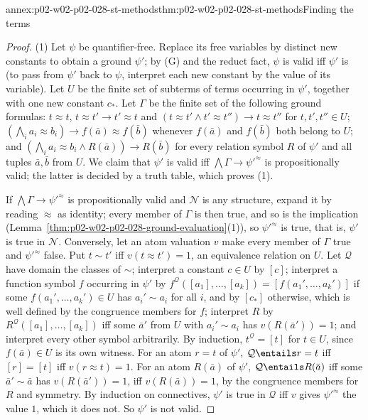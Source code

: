 \begin{annexitem}{annex:p02-w02-p02-028-st-methods}{thm:p02-w02-p02-028-st-methods}{Finding the terms}
\begin{proof}
(1)  Let \(\psi\) be quantifier-free.  Replace its free variables by distinct
new constants to obtain a ground \(\psi'\); by (G) and the reduct fact,
\(\psi\) is valid iff \(\psi'\) is (to pass from \(\psi'\) back to \(\psi\),
interpret each new constant by the value of its variable).  Let \(U\) be the
finite set of subterms of terms occurring in \(\psi'\), together with one
new constant \(c_*\).  Let \(\Gamma\) be the finite set of the following
ground formulas: \(t\approx t\), \(t\approx t'\to t'\approx t\) and
\((t\approx t'\land t'\approx t'')\to t\approx t''\) for \(t,t',t''\in U\);
\((\bigwedge_ia_i\approx b_i)\to f(\bar a)\approx f(\bar b)\) whenever
\(f(\bar a)\) and \(f(\bar b)\) both belong to \(U\); and
\((\bigwedge_ia_i\approx b_i\land R(\bar a))\to R(\bar b)\) for every relation
symbol \(R\) of \(\psi'\) and all tuples \(\bar a,\bar b\) from \(U\).  We
claim that \(\psi'\) is valid iff \(\bigwedge\Gamma\to\psi'^{\approx}\) is
propositionally valid; the latter is decided by a truth table, which proves
(1).

If \(\bigwedge\Gamma\to\psi'^{\approx}\) is propositionally valid and
\(\mathcal N\) is any structure, expand it by reading \(\approx\) as
identity; every member of \(\Gamma\) is then true, and so is the implication
(Lemma~\ref{thm:p02-w02-p02-028-ground-evaluation}(1)), so
\(\psi'^{\approx}\) is true, that is, \(\psi'\) is true in \(\mathcal N\).
Conversely, let an atom valuation \(v\) make every member of \(\Gamma\) true
and \(\psi'^{\approx}\) false.  Put \(t\sim t'\) iff \(v(t\approx t')=1\), an
equivalence relation on \(U\).  Let \(\mathcal Q\) have domain the classes of
\(\sim\); interpret a constant \(c\in U\) by \([c]\); interpret a function
symbol \(f\) occurring in \(\psi'\) by
\(f^{\mathcal Q}([a_1],\ldots,[a_k])=[f(a_1',\ldots,a_k')]\) if some
\(f(a_1',\ldots,a_k')\in U\) has \(a_i'\sim a_i\) for all \(i\), and by
\([c_*]\) otherwise, which is well defined by the congruence members for
\(f\); interpret \(R\) by \(R^{\mathcal Q}([a_1],\ldots,[a_k])\) iff some
\(\bar a'\) from \(U\) with \(a_i'\sim a_i\) has \(v(R(\bar a'))=1\); and
interpret every other symbol arbitrarily.  By induction,
\(t^{\mathcal Q}=[t]\) for \(t\in U\), since \(f(\bar a)\in U\) is its own
witness.  For an atom \(r=t\) of \(\psi'\), \(\mathcal Q\entails r=t\) iff
\([r]=[t]\) iff \(v(r\approx t)=1\).  For an atom \(R(\bar a)\) of \(\psi'\),
\(\mathcal Q\entails R(\bar a)\) iff some \(\bar a'\sim\bar a\) has
\(v(R(\bar a'))=1\), iff \(v(R(\bar a))=1\), by the congruence members for
\(R\) and symmetry.  By induction on connectives, \(\psi'\) is true in
\(\mathcal Q\) iff \(v\) gives \(\psi'^{\approx}\) the value \(1\), which it
does not.  So \(\psi'\) is not valid.


\end{proof}
\end{annexitem}

